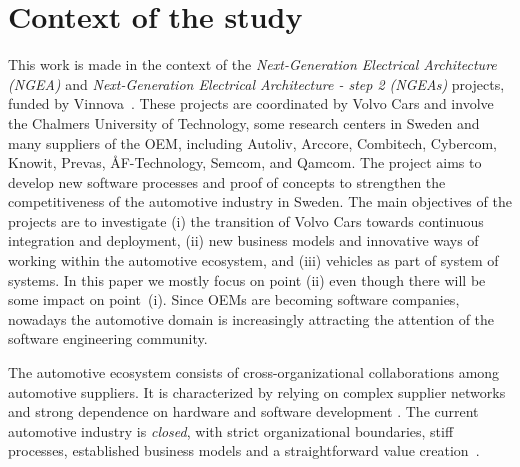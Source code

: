 \section{Context of the study}\label{sec:context}


This work is made in the context of the {\em Next-Generation Electrical Architecture (NGEA)} and {\em Next-Generation Electrical Architecture - step 2 (NGEAs)} projects, funded by Vinnova~\cite{Vinnova}. 
These projects are coordinated by Volvo Cars and involve the Chalmers University of Technology, some research centers in Sweden and many suppliers of the OEM, including Autoliv, Arccore, Combitech, Cybercom, Knowit, Prevas, \AA F-Technology, Semcom, and Qamcom. The project aims to develop new software processes and proof of concepts to strengthen the competitiveness of the automotive industry in Sweden. The main objectives of the projects are to investigate (i) the transition of Volvo Cars towards continuous integration and deployment, (ii) new business models and innovative ways of working within the automotive ecosystem, and (iii) vehicles as part of system of systems. 
In this paper we mostly focus on point (ii) even though there will be some impact on point~(i). Since OEMs are becoming software companies, nowadays the automotive domain is increasingly attracting the attention of the software engineering community.  

The automotive ecosystem consists of cross-organizational collaborations among automotive suppliers. It is characterized by relying on complex supplier networks and strong dependence on hardware and software development \cite{Patrizio2016AAF_Chalmers,Knauss14d.:towards,Broy:2006:CAS:1134285.1134292}.
The current automotive industry is {\em closed}, with strict organizational boundaries, stiff processes, established business models and a straightforward value creation~\cite{ConnectedVehicle2012}.


